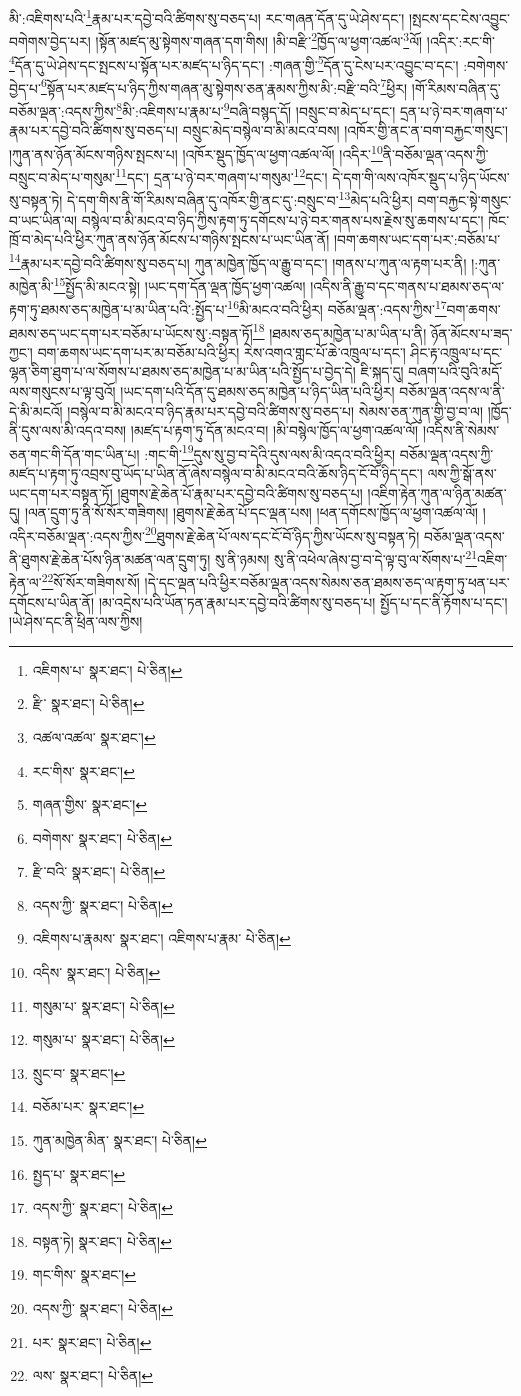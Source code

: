 མི་:འཇིགས་པའི་\footnote{འཇིགས་པ་  སྣར་ཐང་།  པེ་ཅིན། }རྣམ་པར་དབྱེ་བའི་ཚིགས་སུ་བཅད་པ། རང་གཞན་དོན་དུ་ཡེ་ཤེས་དང་། །སྤངས་དང་ངེས་འབྱུང་བགེགས་བྱེད་པར། །སྟོན་མཛད་མུ་སྟེགས་གཞན་དག་གིས། །མི་བརྫི་\footnote{རྫི་  སྣར་ཐང་།  པེ་ཅིན། }ཁྱོད་ལ་ཕྱག་འཚལ་\footnote{འཚལ་འཚལ་  སྣར་ཐང་། }ལོ། །འདིར་:རང་གི་\footnote{རང་གིས་  སྣར་ཐང་། }དོན་དུ་ཡེ་ཤེས་དང་སྤངས་པ་སྟོན་པར་མཛད་པ་ཉིད་དང་། :གཞན་གྱི་\footnote{གཞན་གྱིས་  སྣར་ཐང་། }དོན་དུ་ངེས་པར་འབྱུང་བ་དང་། :བགེགས་བྱེད་པ་\footnote{བགེགས་  སྣར་ཐང་།  པེ་ཅིན། }སྟོན་པར་མཛད་པ་ཉིད་ཀྱིས་གཞན་མུ་སྟེགས་ཅན་རྣམས་ཀྱིས་མི་:བརྫི་བའི་\footnote{རྫི་བའི་  སྣར་ཐང་།  པེ་ཅིན། }ཕྱིར། །གོ་རིམས་བཞིན་དུ་བཅོམ་ལྡན་:འདས་ཀྱིས་\footnote{འདས་ཀྱི་  སྣར་ཐང་།  པེ་ཅིན། }མི་:འཇིགས་པ་རྣམ་པ་\footnote{འཇིགས་པ་རྣམས་  སྣར་ཐང་། འཇིགས་པ་རྣམ་  པེ་ཅིན། }བཞི་བསྙད་དོ། །བསྲུང་བ་མེད་པ་དང་། དྲན་པ་ཉེ་བར་གཞག་པ་རྣམ་པར་དབྱེ་བའི་ཚིགས་སུ་བཅད་པ། བསྲུང་མེད་བསྙེལ་བ་མི་མངའ་བས། །འཁོར་གྱི་ནང་ན་བག་བརྐྱང་གསུང་། །ཀུན་ནས་ཉོན་མོངས་གཉིས་སྤངས་པ། །འཁོར་སྡུད་ཁྱོད་ལ་ཕྱག་འཚལ་ལོ། །འདིར་\footnote{འདིས་  སྣར་ཐང་།  པེ་ཅིན། }ནི་བཅོམ་ལྡན་འདས་ཀྱི་བསྲུང་བ་མེད་པ་གསུམ་\footnote{གསུམ་པ་  སྣར་ཐང་།  པེ་ཅིན། }དང་། དྲན་པ་ཉེ་བར་གཞག་པ་གསུམ་\footnote{གསུམ་པ་  སྣར་ཐང་།  པེ་ཅིན། }དང་། དེ་དག་གི་ལས་འཁོར་སྡུད་པ་ཉིད་ཡོངས་སུ་བསྟན་ཏེ། དེ་དག་གིས་ནི་གོ་རིམས་བཞིན་དུ་འཁོར་གྱི་ནང་དུ་:བསྲུང་བ་\footnote{སྲུང་བ་  སྣར་ཐང་། }མེད་པའི་ཕྱིར། བག་བརྐྱང་སྟེ་གསུང་བ་ཡང་ཡིན་ལ། བསྙེལ་བ་མི་མངའ་བ་ཉིད་ཀྱིས་རྟག་ཏུ་དགོངས་པ་ཉེ་བར་གནས་པས་རྗེས་སུ་ཆགས་པ་དང་། ཁོང་ཁྲོ་བ་མེད་པའི་ཕྱིར་ཀུན་ནས་ཉོན་མོངས་པ་གཉིས་སྤངས་པ་ཡང་ཡིན་ནོ། །བག་ཆགས་ཡང་དག་པར་:བཅོམ་པ་\footnote{བཅོམ་པར་  སྣར་ཐང་། }རྣམ་པར་དབྱེ་བའི་ཚིགས་སུ་བཅད་པ། ཀུན་མཁྱེན་ཁྱོད་ལ་རྒྱུ་བ་དང་། །གནས་པ་ཀུན་ལ་རྟག་པར་ནི། །:ཀུན་མཁྱེན་མི་\footnote{ཀུན་མཁྱེན་མིན་  སྣར་ཐང་།  པེ་ཅིན། }སྤྱོད་མི་མངའ་སྟེ། །ཡང་དག་དོན་ལྡན་ཁྱོད་ཕྱག་འཚལ། །འདིས་ནི་རྒྱུ་བ་དང་གནས་པ་ཐམས་ཅད་ལ་རྟག་ཏུ་ཐམས་ཅད་མཁྱེན་པ་མ་ཡིན་པའི་:སྤྱོད་པ་\footnote{སྤྱད་པ་  སྣར་ཐང་། }མི་མངའ་བའི་ཕྱིར། བཅོམ་ལྡན་:འདས་ཀྱིས་\footnote{འདས་ཀྱི་  སྣར་ཐང་།  པེ་ཅིན། }བག་ཆགས་ཐམས་ཅད་ཡང་དག་པར་བཅོམ་པ་ཡོངས་སུ་:བསྟན་ཏོ།\footnote{བསྟན་ཏེ།  སྣར་ཐང་།  པེ་ཅིན། } །ཐམས་ཅད་མཁྱེན་པ་མ་ཡིན་པ་ནི། ཉོན་མོངས་པ་ཟད་ཀྱང་། བག་ཆགས་ཡང་དག་པར་མ་བཅོམ་པའི་ཕྱིར། རེས་འགའ་གླང་པོ་ཆེ་འཁྲུལ་པ་དང་། ཤིང་རྟ་འཁྲུལ་པ་དང་ལྷན་ཅིག་ཐུག་པ་ལ་སོགས་པ་ཐམས་ཅད་མཁྱེན་པ་མ་ཡིན་པའི་སྤྱོད་པ་བྱེད་དེ། ཇི་སྐད་དུ། བཞག་པའི་བུའི་མདོ་ལས་གསུངས་པ་ལྟ་བུའོ། །ཡང་དག་པའི་དོན་དུ་ཐམས་ཅད་མཁྱེན་པ་ཉིད་ཡིན་པའི་ཕྱིར། བཅོམ་ལྡན་འདས་ལ་ནི་དེ་མི་མངའོ། །བསྙེལ་བ་མི་མངའ་བ་ཉིད་རྣམ་པར་དབྱེ་བའི་ཚིགས་སུ་བཅད་པ། སེམས་ཅན་ཀུན་གྱི་བྱ་བ་ལ། །ཁྱོད་ནི་དུས་ལས་མི་འདའ་བས། །མཛད་པ་རྟག་ཏུ་དོན་མངའ་བ། །མི་བསྙེལ་ཁྱོད་ལ་ཕྱག་འཚལ་ལོ། །འདིས་ནི་སེམས་ཅན་གང་གི་དོན་གང་ཡིན་པ། :གང་གི་\footnote{གང་གིས་  སྣར་ཐང་། }དུས་སུ་བྱ་བ་དེའི་དུས་ལས་མི་འདའ་བའི་ཕྱིར། བཅོམ་ལྡན་འདས་ཀྱི་མཛད་པ་རྟག་ཏུ་འབྲས་བུ་ཡོད་པ་ཡིན་ནོ་ཞེས་བསྙེལ་བ་མི་མངའ་བའི་ཆོས་ཉིད་ངོ་བོ་ཉིད་དང་། ལས་ཀྱི་སྒོ་ནས་ཡང་དག་པར་བསྟན་ཏོ། །ཐུགས་རྗེ་ཆེན་པོ་རྣམ་པར་དབྱེ་བའི་ཚིགས་སུ་བཅད་པ། །འཇིག་རྟེན་ཀུན་ལ་ཉིན་མཚན་དུ། །ལན་དྲུག་ཏུ་ནི་སོ་སོར་གཟིགས། །ཐུགས་རྗེ་ཆེན་པོ་དང་ལྡན་པས། །ཕན་དགོངས་ཁྱོད་ལ་ཕྱག་འཚལ་ལོ། །འདིར་བཅོམ་ལྡན་:འདས་ཀྱིས་\footnote{འདས་ཀྱི་  སྣར་ཐང་།  པེ་ཅིན། }ཐུགས་རྗེ་ཆེན་པོ་ལས་དང་ངོ་བོ་ཉིད་ཀྱིས་ཡོངས་སུ་བསྟན་ཏེ། བཅོམ་ལྡན་འདས་ནི་ཐུགས་རྗེ་ཆེན་པོས་ཉིན་མཚན་ལན་དྲུག་ཏུ། སུ་ནི་ཉམས། སུ་ནི་འཕེལ་ཞེས་བྱ་བ་དེ་ལྟ་བུ་ལ་སོགས་པ་\footnote{པར་  སྣར་ཐང་།  པེ་ཅིན། }འཇིག་རྟེན་ལ་\footnote{ལས་  སྣར་ཐང་།  པེ་ཅིན། }སོ་སོར་གཟིགས་སོ། །དེ་དང་ལྡན་པའི་ཕྱིར་བཅོམ་ལྡན་འདས་སེམས་ཅན་ཐམས་ཅད་ལ་རྟག་ཏུ་ཕན་པར་དགོངས་པ་ཡིན་ནོ། །མ་འདྲེས་པའི་ཡོན་ཏན་རྣམ་པར་དབྱེ་བའི་ཚིགས་སུ་བཅད་པ། སྤྱོད་པ་དང་ནི་རྟོགས་པ་དང་། །ཡེ་ཤེས་དང་ནི་ཕྲིན་ལས་ཀྱིས། 